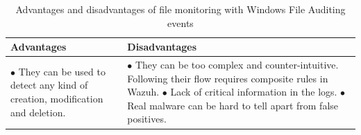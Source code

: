 \begin{table}[H]
	\begin{tabularx}{\textwidth}{|w|w|}
		\hline
		Advantages & Disadvantages\\ \hline
			$\bullet$ They can be used to detect any kind of creation, modification and deletion.
		&
			$\bullet$ They can be too complex and counter-intuitive. Following their flow requires composite rules in Wazuh.
			\linej $\bullet$ Lack of critical information in the logs.
			\linej $\bullet$ Real malware can be hard to tell apart from false positives.
			\\ \hline
	\end{tabularx}
	\caption{Advantages and disadvantages of file monitoring with Windows File Auditing events}
\end{table}

